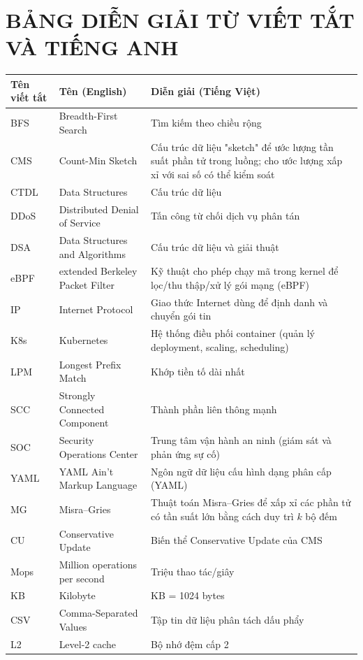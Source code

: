 
\chapter*{BẢNG DIỄN GIẢI TỪ VIẾT TẮT VÀ TIẾNG ANH}


\begin{longtable}{@{}p{3.5cm} >{\raggedright\arraybackslash}p{6cm} >{\raggedright\arraybackslash}p{5cm}@{}}

\textbf{Tên viết tắt} & \textbf{Tên (English)} & \textbf{Diễn giải (Tiếng Việt)} \\
\midrule
\endfirsthead

BFS     & Breadth-First Search & Tìm kiếm theo chiều rộng \\
CMS     & Count-Min Sketch & Cấu trúc dữ liệu "sketch" để ước lượng tần suất phần tử trong luồng; cho ước lượng xấp xỉ với sai số có thể kiểm soát \\
CTDL    & Data Structures & Cấu trúc dữ liệu \\
DDoS    & Distributed Denial of Service & Tấn công từ chối dịch vụ phân tán \\
DSA     & Data Structures and Algorithms & Cấu trúc dữ liệu và giải thuật \\
eBPF    & extended Berkeley Packet Filter & Kỹ thuật cho phép chạy mã trong kernel để lọc/thu thập/xử lý gói mạng (eBPF) \\
IP      & Internet Protocol & Giao thức Internet dùng để định danh và chuyển gói tin \\
K8s     & Kubernetes & Hệ thống điều phối container (quản lý deployment, scaling, scheduling) \\
LPM     & Longest Prefix Match & Khớp tiền tố dài nhất \\
SCC     & Strongly Connected Component & Thành phần liên thông mạnh \\
SOC     & Security Operations Center & Trung tâm vận hành an ninh (giám sát và phản ứng sự cố) \\
YAML    & YAML Ain't Markup Language & Ngôn ngữ dữ liệu cấu hình dạng phân cấp (YAML) \\
MG      & Misra--Gries & Thuật toán Misra--Gries để xấp xỉ các phần tử có tần suất lớn bằng cách duy trì $k$ bộ đếm \\
CU      & Conservative Update & Biến thể Conservative Update của CMS \\
Mops    & Million operations per second & Triệu thao tác/giây \\
KB      & Kilobyte & 1 KB = 1024 bytes \\
CSV     & Comma-Separated Values & Tập tin dữ liệu phân tách dấu phẩy \\
L2      & Level-2 cache & Bộ nhớ đệm cấp 2 \\


\end{longtable}
